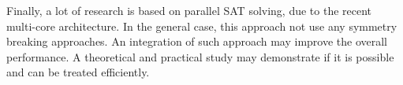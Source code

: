 Finally, a lot of research is based on parallel SAT solving, due to the recent multi-core architecture. In the general case,
this approach not use any symmetry breaking approaches. An integration of such approach may improve the overall performance.
A theoretical and practical study may demonstrate if it is possible and can be treated efficiently.

